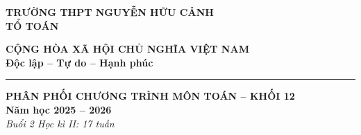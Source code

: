 \documentclass[12pt,a4paper]{article}
\begin{document}
\noindent
\begin{minipage}[t]{0.5\textwidth}
    \centering
    \textbf{TRƯỜNG THPT NGUYỄN HỮU CẢNH}\\
    \textbf{TỔ TOÁN}
\end{minipage}
\begin{minipage}[t]{0.5\textwidth}
    \centering
    \textbf{CỘNG HÒA XÃ HỘI CHỦ NGHĨA VIỆT NAM}\\
    \textbf{Độc lập – Tự do – Hạnh phúc}\\
    \rule{3cm}{0.4pt}
\end{minipage}

\vspace{0.8cm}

\begin{center}
    \Large \textbf{PHÂN PHỐI CHƯƠNG TRÌNH MÔN TOÁN – KHỐI 12} \\
    \large \textbf{Năm học 2025 – 2026} \\
    \large \textit{Buổi 2 Học kì II: 17 tuần}
\end{center}

\vspace{0.5cm}
\end{document}
